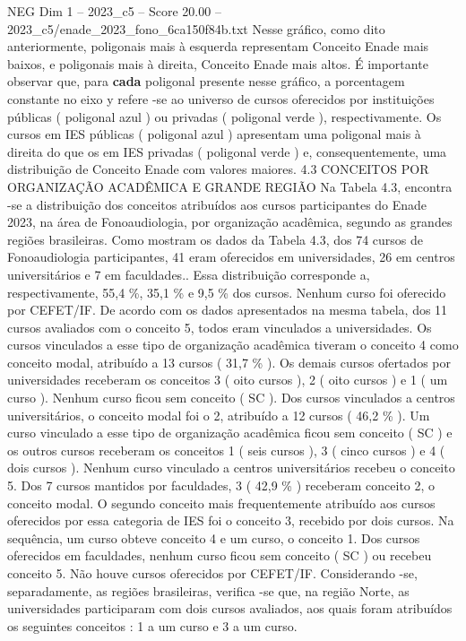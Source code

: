 \begin{textsample}{NEG Dim 1 – 2023\_c5 – Score 20.00 – 2023\_c5/enade\_2023\_fono\_6ca150f84b.txt}
Nesse gráfico, como dito anteriormente, poligonais mais à esquerda representam Conceito Enade mais baixos, e poligonais mais à direita, Conceito Enade mais altos.
É importante observar que, para \textbf{cada} poligonal presente nesse gráfico, a porcentagem constante no eixo y refere -se ao universo de cursos oferecidos por instituições públicas ( poligonal azul ) ou privadas ( poligonal verde ), respectivamente.
Os cursos em IES públicas ( poligonal azul ) apresentam uma poligonal mais à direita do que os em IES privadas ( poligonal verde ) e, consequentemente, uma distribuição de Conceito Enade com valores maiores. 4.3 CONCEITOS POR ORGANIZAÇÃO ACADÊMICA E GRANDE REGIÃO Na Tabela 4.3, encontra -se a distribuição dos conceitos atribuídos aos cursos participantes do Enade 2023, na área de Fonoaudiologia, por organização acadêmica, segundo as grandes regiões brasileiras.
Como mostram os dados da Tabela 4.3, dos 74 cursos de Fonoaudiologia participantes, 41 eram oferecidos em universidades, 26 em centros universitários e 7 em faculdades..
Essa distribuição corresponde a, respectivamente, 55,4 \%, 35,1 \% e 9,5 \% dos cursos.
Nenhum curso foi oferecido por CEFET/IF.
De acordo com os dados apresentados na mesma tabela, dos 11 cursos avaliados com o conceito 5, todos eram vinculados a universidades.
Os cursos vinculados a esse tipo de organização acadêmica tiveram o conceito 4 como conceito modal, atribuído a 13 cursos ( 31,7 \% ).
Os demais cursos ofertados por universidades receberam os conceitos 3 ( oito cursos ), 2 ( oito cursos ) e 1 ( um curso ).
Nenhum curso ficou sem conceito ( SC ).
Dos cursos vinculados a centros universitários, o conceito modal foi o 2, atribuído a 12 cursos ( 46,2 \% ).
Um curso vinculado a esse tipo de organização acadêmica ficou sem conceito ( SC ) e os outros cursos receberam os conceitos 1 ( seis cursos ), 3 ( cinco cursos ) e 4 ( dois cursos ).
Nenhum curso vinculado a centros universitários recebeu o conceito 5.
Dos 7 cursos mantidos por faculdades, 3 ( 42,9 \% ) receberam conceito 2, o conceito modal.
O segundo conceito mais frequentemente atribuído aos cursos oferecidos por essa categoria de IES foi o conceito 3, recebido por dois cursos.
Na sequência, um curso obteve conceito 4 e um curso, o conceito 1.
Dos cursos oferecidos em faculdades, nenhum curso ficou sem conceito ( SC ) ou recebeu conceito 5.
Não houve cursos oferecidos por CEFET/IF.
Considerando -se, separadamente, as regiões brasileiras, verifica -se que, na região Norte, as universidades participaram com dois cursos avaliados, aos quais foram atribuídos os seguintes conceitos : 1 a um curso e 3 a um curso.

\end{textsample}
